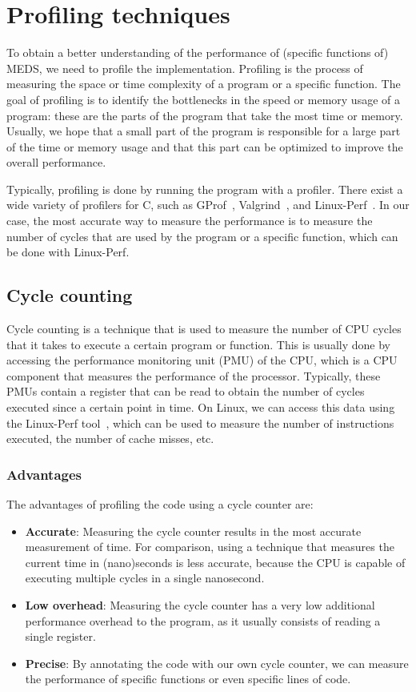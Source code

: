 \documentclass[11pt,a4paper]{report}
\theoremstyle{definition}
\begin{document}
\section{Profiling techniques}
To obtain a better understanding of the performance of (specific functions of) MEDS, we need to profile the implementation. Profiling is the process of measuring the space or time complexity of a program or a specific function. The goal of profiling is to identify the bottlenecks in the speed or memory usage of a program: these are the parts of the program that take the most time or memory. Usually, we hope that a small part of the program is responsible for a large part of the time or memory usage and that this part can be optimized to improve the overall performance.

Typically, profiling is done by running the program with a profiler. There exist a wide variety of profilers for C, such as GProf~\cite{graham1982gprof}, Valgrind~\cite{nethercote2007valgrind}, and Linux-Perf~\cite{de2010new}. In our case, the most accurate way to measure the performance is to measure the number of cycles that are used by the program or a specific function, which can be done with Linux-Perf.

\subsection{Cycle counting}
Cycle counting is a technique that is used to measure the number of CPU cycles that it takes to execute a certain program or function. This is usually done by accessing the performance monitoring unit (PMU) of the CPU, which is a CPU component that measures the performance of the processor. Typically, these PMUs contain a register that can be read to obtain the number of cycles executed since a certain point in time. On Linux, we can access this data using the Linux-Perf tool~\cite{de2010new}, which can be used to measure the number of instructions executed, the number of cache misses, etc.

\subsubsection{Advantages}
The advantages of profiling the code using a cycle counter are:
\begin{itemize}
  \item \textbf{Accurate}: Measuring the cycle counter results in the most accurate measurement of time. For comparison, using a technique that measures the current time in (nano)seconds is less accurate, because the CPU is capable of executing multiple cycles in a single nanosecond.
  \item \textbf{Low overhead}: Measuring the cycle counter has a very low additional performance overhead to the program, as it usually consists of reading a single register.
  \item \textbf{Precise}: By annotating the code with our own cycle counter, we can measure the performance of specific functions or even specific lines of code.
\end{itemize}
\end{document}
